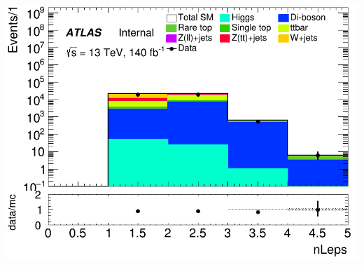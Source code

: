 \documentclass[usenames,dvipsnames]{beamer}
\begin{document}
\begin{frame}
\begin{minipage}{0.32\textwidth}
        \includegraphics[width=\textwidth]{graphics/L_met/L_met_nLeps.png}
    \end{minipage}
    
    \vspace{0.5cm} %


\end{frame}
\end{document}
